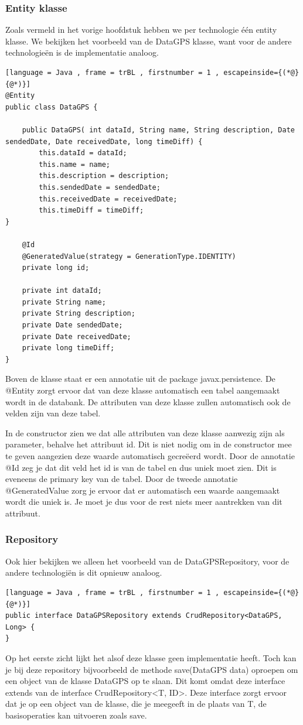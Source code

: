 \subsubsection{Entity klasse}
Zoals vermeld in het vorige hoofdstuk hebben we per technologie één entity klasse. We bekijken het voorbeeld van de DataGPS klasse, want voor de andere technologieën is de implementatie analoog.
\begin{lstlisting}[language = Java , frame = trBL , firstnumber = 1 , escapeinside={(*@}{@*)}]
@Entity
public class DataGPS {

    public DataGPS( int dataId, String name, String description, Date sendedDate, Date receivedDate, long timeDiff) {
        this.dataId = dataId;
        this.name = name;
        this.description = description;
        this.sendedDate = sendedDate;
        this.receivedDate = receivedDate;
        this.timeDiff = timeDiff;
}

    @Id
    @GeneratedValue(strategy = GenerationType.IDENTITY)
    private long id;

    private int dataId;
    private String name;
    private String description;
    private Date sendedDate;
    private Date receivedDate;
    private long timeDiff;
}
\end{lstlisting}
Boven de klasse staat er een annotatie uit de package javax.persistence. De @Entity zorgt ervoor dat van deze klasse automatisch een tabel aangemaakt wordt in de databank. De attributen van deze klasse zullen automatisch ook de velden zijn van deze tabel.

In de constructor zien we dat alle attributen van deze klasse aanwezig zijn als parameter, behalve het attribuut id. Dit is niet nodig om in de constructor mee te geven aangezien deze waarde automatisch gecreëerd wordt. Door de annotatie @Id zeg je dat dit veld het id is van de tabel en dus uniek moet zien. Dit is eveneens de primary key van de tabel. Door de tweede annotatie @GeneratedValue zorg je ervoor dat er automatisch een waarde aangemaakt wordt die uniek is. Je moet je dus voor de rest niets meer aantrekken van dit attribuut.

\subsubsection{Repository}
Ook hier bekijken we alleen het voorbeeld van de DataGPSRepository, voor de andere technologiën is dit opnieuw analoog.
\begin{lstlisting}[language = Java , frame = trBL , firstnumber = 1 , escapeinside={(*@}{@*)}]
public interface DataGPSRepository extends CrudRepository<DataGPS, Long> {
}
\end{lstlisting}
Op het eerste zicht lijkt het alsof deze klasse geen implementatie heeft. Toch kan je bij deze repository bijvoorbeeld de methode save(DataGPS data) oproepen om een object van de klasse DataGPS op te slaan. Dit komt omdat deze interface extends van de interface CrudRepository<T, ID>. Deze interface zorgt ervoor dat je op een object van de klasse, die je meegeeft in de plaats van T, de basisoperaties kan uitvoeren zoals save.

